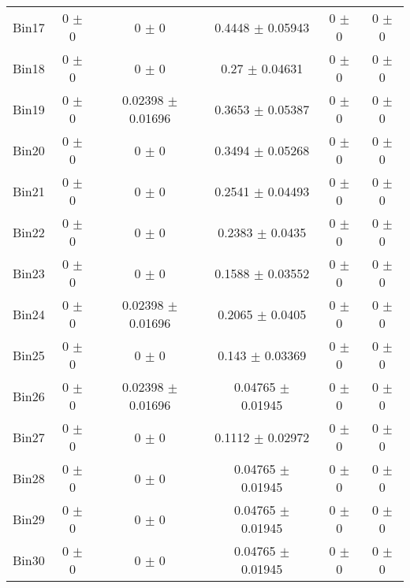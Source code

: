 \begin{tabular}{@{\extracolsep{4pt}}lccccc@{}}
     Bin17 & 0 $\pm$ 0 & 0 $\pm$ 0 & 0.4448 $\pm$ 0.05943 & 0 $\pm$ 0 & 0 $\pm$ 0 \\ 
     Bin18 & 0 $\pm$ 0 & 0 $\pm$ 0 & 0.27 $\pm$ 0.04631 & 0 $\pm$ 0 & 0 $\pm$ 0 \\ 
     Bin19 & 0 $\pm$ 0 & 0.02398 $\pm$ 0.01696 & 0.3653 $\pm$ 0.05387 & 0 $\pm$ 0 & 0 $\pm$ 0 \\ 
     Bin20 & 0 $\pm$ 0 & 0 $\pm$ 0 & 0.3494 $\pm$ 0.05268 & 0 $\pm$ 0 & 0 $\pm$ 0 \\ 
     Bin21 & 0 $\pm$ 0 & 0 $\pm$ 0 & 0.2541 $\pm$ 0.04493 & 0 $\pm$ 0 & 0 $\pm$ 0 \\ 
     Bin22 & 0 $\pm$ 0 & 0 $\pm$ 0 & 0.2383 $\pm$ 0.0435 & 0 $\pm$ 0 & 0 $\pm$ 0 \\ 
     Bin23 & 0 $\pm$ 0 & 0 $\pm$ 0 & 0.1588 $\pm$ 0.03552 & 0 $\pm$ 0 & 0 $\pm$ 0 \\ 
     Bin24 & 0 $\pm$ 0 & 0.02398 $\pm$ 0.01696 & 0.2065 $\pm$ 0.0405 & 0 $\pm$ 0 & 0 $\pm$ 0 \\ 
     Bin25 & 0 $\pm$ 0 & 0 $\pm$ 0 & 0.143 $\pm$ 0.03369 & 0 $\pm$ 0 & 0 $\pm$ 0 \\ 
     Bin26 & 0 $\pm$ 0 & 0.02398 $\pm$ 0.01696 & 0.04765 $\pm$ 0.01945 & 0 $\pm$ 0 & 0 $\pm$ 0 \\ 
     Bin27 & 0 $\pm$ 0 & 0 $\pm$ 0 & 0.1112 $\pm$ 0.02972 & 0 $\pm$ 0 & 0 $\pm$ 0 \\ 
     Bin28 & 0 $\pm$ 0 & 0 $\pm$ 0 & 0.04765 $\pm$ 0.01945 & 0 $\pm$ 0 & 0 $\pm$ 0 \\ 
     Bin29 & 0 $\pm$ 0 & 0 $\pm$ 0 & 0.04765 $\pm$ 0.01945 & 0 $\pm$ 0 & 0 $\pm$ 0 \\ 
     Bin30 & 0 $\pm$ 0 & 0 $\pm$ 0 & 0.04765 $\pm$ 0.01945 & 0 $\pm$ 0 & 0 $\pm$ 0 \\ 
\hline\hline
  \end{tabular}
